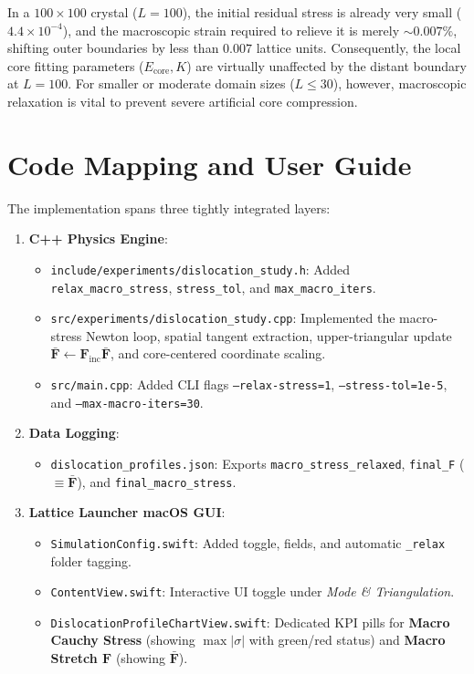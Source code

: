 \documentclass[11pt,a4paper]{article}
\begin{document}
In a $100 \times 100$ crystal ($L = 100$), the initial residual stress is already very small ($4.4 \times 10^{-4}$), and the macroscopic strain required to relieve it is merely $\sim 0.007\%$, shifting outer boundaries by less than $0.007$ lattice units. Consequently, the local core fitting parameters ($E_{\text{core}}, K$) are virtually unaffected by the distant boundary at $L = 100$. For smaller or moderate domain sizes ($L \le 30$), however, macroscopic relaxation is vital to prevent severe artificial core compression.

\section{Code Mapping and User Guide}

The implementation spans three tightly integrated layers:
\begin{enumerate}
    \item \textbf{C++ Physics Engine}:
    \begin{itemize}
        \item \texttt{include/experiments/dislocation\_study.h}: Added \texttt{relax\_macro\_stress}, \texttt{stress\_tol}, and \texttt{max\_macro\_iters}.
        \item \texttt{src/experiments/dislocation\_study.cpp}: Implemented the macro-stress Newton loop, spatial tangent extraction, upper-triangular update $\bar{\mathbf{F}} \gets \mathbf{F}_{\text{inc}}\bar{\mathbf{F}}$, and core-centered coordinate scaling.
        \item \texttt{src/main.cpp}: Added CLI flags \texttt{--relax-stress=1}, \texttt{--stress-tol=1e-5}, and \texttt{--max-macro-iters=30}.
    \end{itemize}
    \item \textbf{Data Logging}:
    \begin{itemize}
        \item \texttt{dislocation\_profiles.json}: Exports \texttt{macro\_stress\_relaxed}, \texttt{final\_F} ($\equiv \bar{\mathbf{F}}$), and \texttt{final\_macro\_stress}.
    \end{itemize}
    \item \textbf{Lattice Launcher macOS GUI}:
    \begin{itemize}
        \item \texttt{SimulationConfig.swift}: Added toggle, fields, and automatic \texttt{\_relax} folder tagging.
        \item \texttt{ContentView.swift}: Interactive UI toggle under \emph{Mode \& Triangulation}.
        \item \texttt{DislocationProfileChartView.swift}: Dedicated KPI pills for \textbf{Macro Cauchy Stress} (showing $\max|\sigma|$ with green/red status) and \textbf{Macro Stretch $\mathbf{F}$} (showing $\bar{\mathbf{F}}$).
    \end{itemize}
\end{enumerate}
\end{document}
